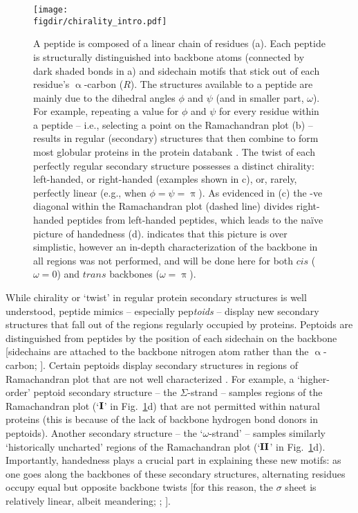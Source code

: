 \documentclass[fleqn,10pt]{wlpeerj} %
\newcommand{\Fig}[1]{Fig.~\ref{#1}}
\newcommand{\figdir}{./figures}
\begin{document}
\begin{figure}[t!]
\centering
\texttt{[image: \\figdir/chirality\_intro.pdf]}
\caption{\label{fig:intro} A peptide is composed of a linear chain of residues (a). Each peptide is structurally distinguished into backbone atoms (connected by dark shaded bonds in a) and sidechain motifs that stick out of each residue's $\upalpha$-carbon ($R$). The structures available to a peptide are mainly due to the dihedral angles $\phi$ and $\psi$ (and in smaller part, $\omega$). For example, repeating a value for $\phi$ and $\psi$ for every residue within a peptide -- i.e., selecting a point on the Ramachandran plot (b) -- results in regular (secondary) structures that then combine to form most globular proteins in the protein databank \citep{Berman2000}. The twist of each perfectly regular secondary structure possesses a distinct chirality: left-handed, or right-handed (examples shown in c), or, rarely, perfectly linear (e.g., when $\phi=\psi=\uppi$). As evidenced in (c) the -ve diagonal within the Ramachandran plot (dashed line) divides right-handed peptides from left-handed peptides, which leads to the na{\"i}ve picture of handedness (d). \cite{Zacharias2013} indicates that this picture is over simplistic, however an in-depth characterization of the backbone in all regions was not performed, and will be done here for both $cis$ ($\omega=0$) and $trans$ backbones ($\omega=\uppi$).}
\end{figure}

While chirality or `twist' in regular protein secondary structures is well understood, peptide mimics -- especially pep\textit{toids} -- display new secondary structures that fall out of the regions regularly occupied by proteins. Peptoids are distinguished from peptides by the position of each sidechain on the backbone [sidechains are attached to the backbone nitrogen atom rather than the $\upalpha$-carbon; \cite{Sun2013}]. %
Certain peptoids display secondary structures in regions of Ramachandran plot that are not well characterized  \citep{Sun2013,Goodman2007,Culf2010,Beke2006,Pohl2012,Zuckermann2009,Sun2013}. For example, a `higher-order' peptoid secondary structure -- the $\Sigma$-strand \citep{Mannige2015,Robertson2016} -- samples regions of the Ramachandran plot (`$\textrm{\textbf{I}}$' in \Fig{fig:intro}d) that are not permitted within natural proteins (this is because of the lack of backbone hydrogen bond donors in peptoids). Another secondary structure -- the `$\omega$-strand' \citep{Gorske2016} -- samples similarly `historically uncharted' regions of the Ramachandran plot (`$\textrm{\textbf{II}}$' in \Fig{fig:intro}d). Importantly, handedness plays a crucial part in explaining these new motifs: as one goes along the backbones of these secondary structures, alternating residues occupy equal but opposite backbone twists [for this reason, the $\sigma$ sheet is relatively linear, albeit meandering; \cite{Mannige2015}; \cite{MannigeKunduWhitelam2016}].
\end{document}
